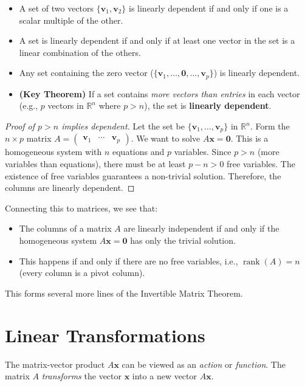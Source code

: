 \documentclass[oneside]{book}
\begin{document}
\begin{property}
\begin{itemize}
    \item A set of two vectors $\{\mathbf{v}_1, \mathbf{v}_2\}$ is linearly dependent if and only if one is a scalar multiple of the other.
    \item A set is linearly dependent if and only if at least one vector in the set is a linear combination of the others.
    \item Any set containing the zero vector ($\{\mathbf{v}_1, \ldots, \mathbf{0}, \ldots, \mathbf{v}_p\}$) is linearly dependent.
    \item \textbf{(Key Theorem)} If a set contains \emph{more vectors than entries} in each vector (e.g., $p$ vectors in $\mathbb{R}^n$ where $p > n$), the set is \textbf{linearly dependent}.
\end{itemize}
\end{property}
\begin{proof}[Proof of $p > n$ implies dependent]
Let the set be $\{\mathbf{v}_1, \ldots, \mathbf{v}_p\}$ in $\mathbb{R}^n$.
Form the $n \times p$ matrix $A = \begin{pmatrix} \mathbf{v}_1 & \cdots & \mathbf{v}_p \end{pmatrix}$.
We want to solve $A\mathbf{x} = \mathbf{0}$.
This is a homogeneous system with $n$ equations and $p$ variables.
Since $p > n$ (more variables than equations), there must be at least $p - n > 0$ free variables.
The existence of free variables guarantees a non-trivial solution.
Therefore, the columns are linearly dependent.
\end{proof}

Connecting this to matrices, we see that:
\begin{itemize}
    \item The columns of a matrix $A$ are linearly independent if and only if the homogeneous system $A\mathbf{x} = \mathbf{0}$ has only the trivial solution.
    \item This happens if and only if there are no free variables, i.e., $\operatorname{rank}(A) = n$ (every column is a pivot column).
\end{itemize}
This forms several more lines of the Invertible Matrix Theorem.

\section{Linear Transformations}
The matrix-vector product $A\mathbf{x}$ can be viewed as an \emph{action} or \emph{function}. The matrix $A$ \emph{transforms} the vector $\mathbf{x}$ into a new vector $A\mathbf{x}$.
\end{document}
